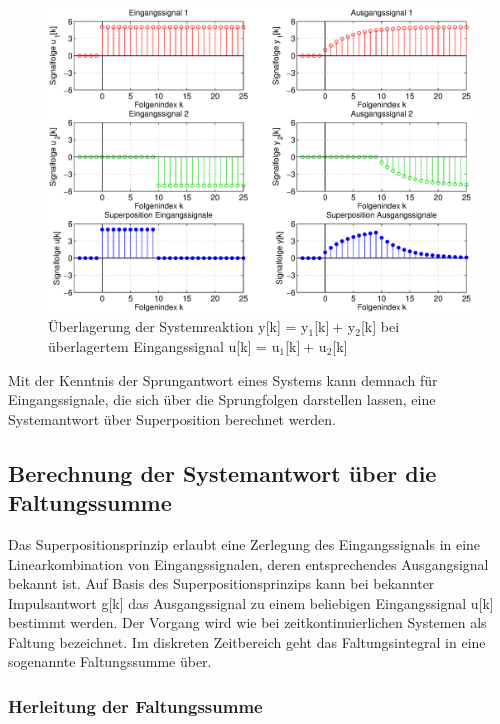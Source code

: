 \begin{figure}[H]
  \centerline{\includegraphics[width=1\textwidth]{Kapitel4/Bilder/image13.eps}}
  \caption{\"{U}berlagerung der Systemreaktion y[k] = y${}_{1}$[k]${}_{\ }$+ y${}_{2}$[k] bei \"{u}berlagertem Eingangssignal u[k] = u${}_{1}$[k]${}_{\ }$+ u${}_{2}$[k]}
  \label{fig:SuperpositionRekursiverFilter}
\end{figure}

\noindent Mit der Kenntnis der Sprungantwort eines Systems kann demnach f\"{u}r Eingangssignale, die sich \"{u}ber die Sprungfolgen darstellen lassen, eine Systemantwort \"{u}ber Superposition berechnet werden. 

\clearpage

\subsection{Berechnung der Systemantwort \"{u}ber die Faltungssumme}

\noindent Das Superpositionsprinzip erlaubt eine Zerlegung des Eingangssignals in eine Linearkombination von Eingangssignalen, deren entsprechendes Ausgangsignal bekannt ist. Auf Basis des Superpositionsprinzips kann bei bekannter Impulsantwort g[k] das Ausgangssignal zu einem beliebigen Eingangssignal u[k] bestimmt werden. Der Vorgang wird wie bei zeitkontinuierlichen Systemen als Faltung bezeichnet. Im diskreten Zeitbereich geht das Faltungsintegral in eine sogenannte Faltungssumme \"{u}ber.

\subsubsection{Herleitung der Faltungssumme}

